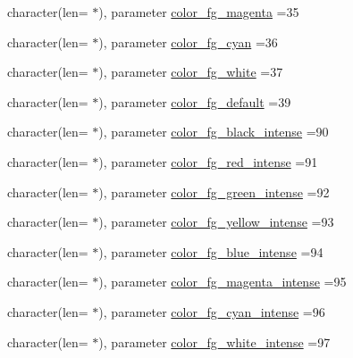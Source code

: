\begin{DoxyCompactItemize}
\item 
character(len= $\ast$), parameter \mbox{\hyperlink{namespacem__escape_ac56b264a4d6c5f3668bac32b791e54de}{color\+\_\+fg\+\_\+magenta}} =\textquotesingle{}35\textquotesingle{}
\item 
character(len= $\ast$), parameter \mbox{\hyperlink{namespacem__escape_a0bbc85c7110c9b67456884baafe31daf}{color\+\_\+fg\+\_\+cyan}} =\textquotesingle{}36\textquotesingle{}
\item 
character(len= $\ast$), parameter \mbox{\hyperlink{namespacem__escape_ae410339e5c6b5468a65e8ce193941ea4}{color\+\_\+fg\+\_\+white}} =\textquotesingle{}37\textquotesingle{}
\item 
character(len= $\ast$), parameter \mbox{\hyperlink{namespacem__escape_aaeff9968bb1e29198469d5d8109e5f41}{color\+\_\+fg\+\_\+default}} =\textquotesingle{}39\textquotesingle{}
\item 
character(len= $\ast$), parameter \mbox{\hyperlink{namespacem__escape_a75d8856bae4a4b8875d48ce2e3a3409a}{color\+\_\+fg\+\_\+black\+\_\+intense}} =\textquotesingle{}90\textquotesingle{}
\item 
character(len= $\ast$), parameter \mbox{\hyperlink{namespacem__escape_a9355532fa2ee17b47e72208480a86707}{color\+\_\+fg\+\_\+red\+\_\+intense}} =\textquotesingle{}91\textquotesingle{}
\item 
character(len= $\ast$), parameter \mbox{\hyperlink{namespacem__escape_a21c7f9b0377ba62dc353e09c05cc5f35}{color\+\_\+fg\+\_\+green\+\_\+intense}} =\textquotesingle{}92\textquotesingle{}
\item 
character(len= $\ast$), parameter \mbox{\hyperlink{namespacem__escape_a7fb2b231cf28bd2ffbf015d7430b46db}{color\+\_\+fg\+\_\+yellow\+\_\+intense}} =\textquotesingle{}93\textquotesingle{}
\item 
character(len= $\ast$), parameter \mbox{\hyperlink{namespacem__escape_a57cc52b1beef27fae861cae6448221fe}{color\+\_\+fg\+\_\+blue\+\_\+intense}} =\textquotesingle{}94\textquotesingle{}
\item 
character(len= $\ast$), parameter \mbox{\hyperlink{namespacem__escape_ac47d36c6fed693f69eff29d0046c8f20}{color\+\_\+fg\+\_\+magenta\+\_\+intense}} =\textquotesingle{}95\textquotesingle{}
\item 
character(len= $\ast$), parameter \mbox{\hyperlink{namespacem__escape_a58a755722e6672a1fe8ef98637540105}{color\+\_\+fg\+\_\+cyan\+\_\+intense}} =\textquotesingle{}96\textquotesingle{}
\item 
character(len= $\ast$), parameter \mbox{\hyperlink{namespacem__escape_ac0eb5968bfff3dfa064ec28b5218b2bf}{color\+\_\+fg\+\_\+white\+\_\+intense}} =\textquotesingle{}97\textquotesingle{}

\end{DoxyCompactItemize}
